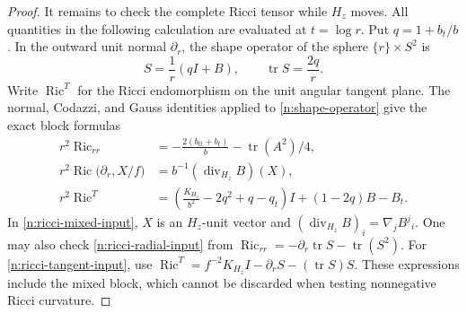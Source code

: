 \begin{proof}
It remains to check the complete Ricci tensor while $H_z$ moves.  All
quantities in the following calculation are evaluated at $t=\log r$.
Put $q=1+b_t/b$.  In the outward unit normal $\partial_r$, the shape
operator of the sphere $\{r\}\times S^2$ is
\begin{equation}
 S=\frac1r(qI+B),\qquad \operatorname{tr}S=\frac{2q}{r}.
 \label{n:shape-operator}
\end{equation}
Write $\operatorname{Ric}^{T}$ for the Ricci endomorphism on the unit
angular tangent plane.  The normal, Codazzi, and Gauss identities applied
to \eqref{n:shape-operator} give the exact block formulas
\begin{align}
 r^2\operatorname{Ric}_{rr}
   &=-\frac{2(b_{tt}+b_t)}{b}-\operatorname{tr}(A^2)/4,
       \label{n:ricci-radial-input}\\
 r^2\operatorname{Ric}\bigl(\partial_r,X/f\bigr)
   &=b^{-1}(\operatorname{div}_{H_z}B)(X),
       \label{n:ricci-mixed-input}\\
 r^2\operatorname{Ric}^{T}
   &=\left(\frac{K_{H_z}}{b^2}-2q^2+q-q_t\right)I
       +(1-2q)B-B_t. \label{n:ricci-tangent-input}
\end{align}
In \eqref{n:ricci-mixed-input}, $X$ is an $H_z$-unit vector and
$(\operatorname{div}_{H_z}B)_i=\nabla_jB^j{}_i$.  One may also check
\eqref{n:ricci-radial-input} from
$\operatorname{Ric}_{rr}=-\partial_r\operatorname{tr}S-
\operatorname{tr}(S^2)$.  For \eqref{n:ricci-tangent-input}, use
$\operatorname{Ric}^{T}=f^{-2}K_{H_z}I-
\partial_rS-(\operatorname{tr}S)S$.  These expressions include the mixed
block, which cannot be discarded when testing nonnegative Ricci curvature.


\end{proof}

